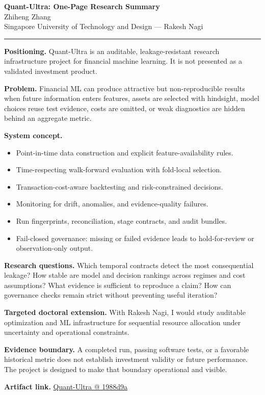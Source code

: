 \documentclass[11pt]{article}
\makeatletter
\newcommand{\ApplicantName}{Zhiheng Zhang}
\newcommand{\ApplicantGitHub}{\href{https://github.com/zhiheng-zhang-Mera/Quant-Ultra/tree/1988d9a8530da91a8158de864d098ea869098923}{Quant-Ultra @ 1988d9a}}
\makeatother
\begin{document}
\begin{center}
{\LARGE\bfseries Quant-Ultra: One-Page Research Summary}\\[0.25em]
{\large \ApplicantName}\\
Singapore University of Technology and Design --- Rakesh Nagi
\end{center}
\vspace{0.35em}\hrule\vspace{0.65em}

\textbf{Positioning.} Quant-Ultra is an auditable, leakage-resistant research infrastructure project for financial machine learning. It is not presented as a validated investment product.

\textbf{Problem.} Financial ML can produce attractive but non-reproducible results when future information enters features, assets are selected with hindsight, model choices reuse test evidence, costs are omitted, or weak diagnostics are hidden behind an aggregate metric.

\textbf{System concept.}
\begin{itemize}
\item Point-in-time data construction and explicit feature-availability rules.
\item Time-respecting walk-forward evaluation with fold-local selection.
\item Transaction-cost-aware backtesting and risk-constrained decisions.
\item Monitoring for drift, anomalies, and evidence-quality failures.
\item Run fingerprints, reconciliation, stage contracts, and audit bundles.
\item Fail-closed governance: missing or failed evidence leads to hold-for-review or observation-only output.
\end{itemize}

\textbf{Research questions.} Which temporal contracts detect the most consequential leakage? How stable are model and decision rankings across regimes and cost assumptions? What evidence is sufficient to reproduce a claim? How can governance checks remain strict without preventing useful iteration?

\textbf{Targeted doctoral extension.} With Rakesh Nagi, I would study auditable optimization and ML infrastructure for sequential resource allocation under uncertainty and operational constraints.

\textbf{Evidence boundary.} A completed run, passing software tests, or a favorable historical metric does not establish investment validity or future performance. The project is designed to make that boundary operational and visible.

\textbf{Artifact link.} \ApplicantGitHub
\end{document}
